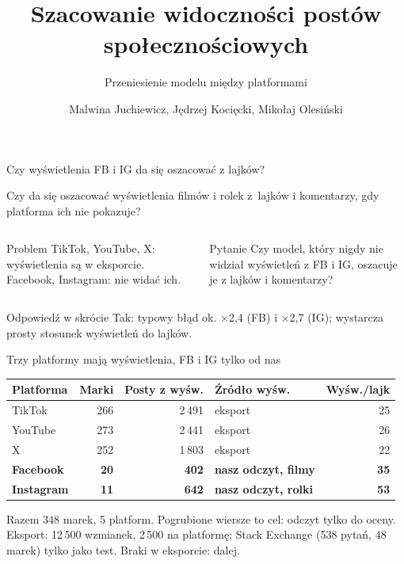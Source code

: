 \documentclass[aspectratio=169,10pt]{beamer}
\title{Szacowanie widoczności postów społecznościowych}
\subtitle{Przeniesienie modelu między platformami}
\author{Malwina Juchiewicz, Jędrzej Kocięcki, Mikołaj Olesiński}
\institute{Politechnika Wrocławska}
\date{}
\renewcommand{\x}[1]{$\times$#1}
\begin{document}
\begin{frame}\vspace*{-14pt}\titlepage\end{frame}

\begin{frame}{Czy wyświetlenia FB i IG da się oszacować z lajków?}
\begin{center}
{\Large Czy da się oszacować \alert{wyświetlenia filmów i rolek} z~lajków i komentarzy, gdy platforma ich nie pokazuje?}
\end{center}
\vspace{4pt}
\begin{columns}[T]
\begin{block}{Problem}
\small TikTok, YouTube, X: wyświetlenia są w eksporcie. Facebook, Instagram: \alert{nie widać ich}.
\end{block}
\begin{block}{Pytanie}
\small Czy model, który \alert{nigdy nie widział} wyświetleń z FB i IG, oszacuje je z lajków i komentarzy?
\end{block}
\end{columns}
\vspace{6pt}
\begin{alertblock}{Odpowiedź w skrócie}
\normalsize Tak: typowy błąd ok. \x{2,4} (FB) i \x{2,7} (IG); wystarcza prosty stosunek wyświetleń do lajków.
\end{alertblock}
\end{frame}

\begin{frame}{Trzy platformy mają wyświetlenia, FB i IG tylko od nas}
\centering\small
\setlength{\tabcolsep}{6pt}\renewcommand{\arraystretch}{1.3}
\begin{tabular}{lrrlr}
\toprule
Platforma & Marki & Posty z wyśw. & Źródło wyśw. & Wyśw./lajk \\
\midrule
TikTok    & 266 & 2\,491 & eksport & 25 \\
YouTube   & 273 & 2\,441 & eksport & 26 \\
X         & 252 & 1\,803 & eksport & 22 \\
\midrule
\textbf{Facebook}  & \textbf{20} & \textbf{402} & \textbf{nasz odczyt, filmy} & \textbf{35} \\
\textbf{Instagram} & \textbf{11} & \textbf{642} & \textbf{nasz odczyt, rolki} & \textbf{53} \\
\bottomrule
\end{tabular}
\vspace{10pt}

Razem 348 marek, 5 platform. Pogrubione wiersze to cel: odczyt \alert{tylko do oceny}.
\vfill
{\scriptsize\color{mut} Eksport: 12\,500 wzmianek, 2\,500 na platformę; Stack Exchange (538 pytań, 48 marek) tylko jako test. Braki w eksporcie: dalej.}
\end{frame}
\end{document}
